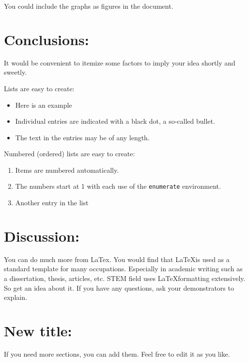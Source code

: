 \documentclass[11pt]{report}	%
\begin{document}
You could include the graphs as figures in the document.

\section*{Conclusions:} 

It would be convenient to itemize some factors to imply your idea shortly and sweetly.

Lists are easy to create:
\begin{itemize}
  \item Here is an example
  \item Individual entries are indicated with a black dot, a so-called bullet.
  \item The text in the entries may be of any length.
\end{itemize}

Numbered (ordered) lists are easy to create:
\begin{enumerate}
  \item Items are numbered automatically.
  \item The numbers start at 1 with each use of the \texttt{enumerate} environment.
  \item Another entry in the list
\end{enumerate}

\section*{Discussion:} 

You can do much more from LaTex. You would find that \LaTeX is used as a standard template for many occupations. Especially in academic writing such as a dissertation, thesis, articles, etc. STEM field uses \LaTeX formatting extensively. So get an idea about it. If you have any questions, ask your demonstrators to explain.

\section*{New title:} 

If you need more sections, you can add them. Feel free to edit it as you like.
\end{document}
